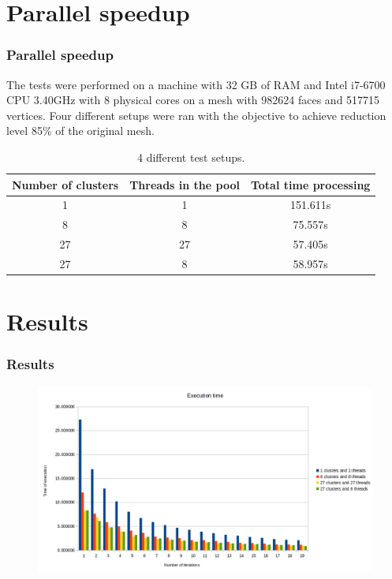 \documentclass[
	10pt,
	t		%
]{beamer}
\begin{document}
\section{Parallel speedup}
\begin{frame}
\centering
\frametitle{Parallel speedup}
The tests were performed on a machine with 32 GB of RAM and Intel i7-6700 CPU 3.40GHz with 8 physical cores on a mesh with 982624 faces and 517715 vertices. Four different setups were ran with the objective to achieve reduction level 85\% of the original mesh.
\begin{table}[h!]
\centering
\begin{tabular}{ |c|c|c| } 
 \hline
 Number of clusters & Threads in the pool & Total time processing\\
 \hline
 1 & 1 & 151.611s\\ 
 8 & 8 & 75.557s\\ 
 27 & 27 & 57.405s\\
 27 & 8 & 58.957s\\
 \hline
\end{tabular}
\caption{4 different test setups.}
\end{table}
\end{frame}

\section{Results}
\begin{frame}
\frametitle{Results}
\begin{figure}[ht]
\centering
\includegraphics[width=1\textwidth]{chart}
\end{figure}
\end{frame}
\end{document}
